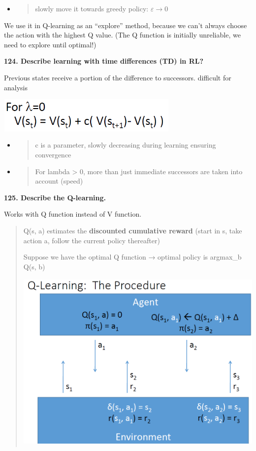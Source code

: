 \begin{itemize}
\item
  \begin{quote}
  slowly move it towards greedy policy: $\varepsilon \to 0$
  \end{quote}
\end{itemize}

We use it in Q-learning as an ``explore'' method, because we can't
always choose the action with the highest Q value. (The Q function is
initially unreliable, we need to explore until optimal!)

\textbf{124. Describe learning with time differences (TD) in RL?}

Previous states receive a portion of the difference to successors.
difficult for analysis

\includegraphics[width=3.49479in,height=0.67429in]{media/image7.png}

\begin{itemize}
\item
  \begin{quote}
  c is a parameter, slowly decreasing during learning ensuring
  convergence
  \end{quote}
\item
  \begin{quote}
  For lambda \textgreater{} 0, more than just immediate successors are
  taken into account (speed)
  \end{quote}
\end{itemize}

\textbf{125. Describe the Q-learning.}

Works with Q function instead of V function.

\begin{quote}
Q(s, a) estimates the \textbf{discounted cumulative reward} (start in s,
take action a, follow the current policy thereafter)

Suppose we have the optimal Q function → optimal policy is argmax\_b
Q(s, b)

\includegraphics[width=4.90928in,height=3.50521in]{media/image3.png}
\end{quote}

